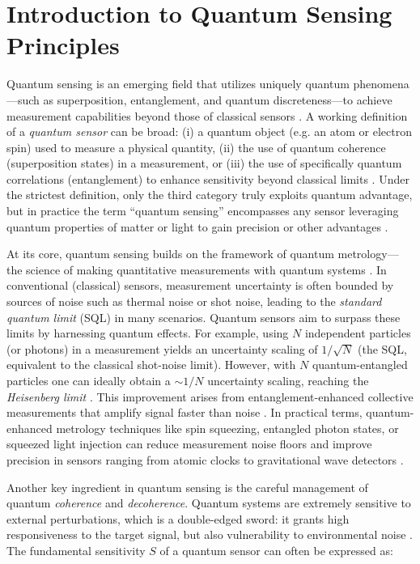 
\chapter{Introduction to Quantum Sensing Principles}

Quantum sensing is an emerging field that utilizes uniquely quantum
phenomena—such as superposition, entanglement, and quantum
discreteness—to achieve measurement capabilities beyond those of
classical sensors . A working definition of a \emph{quantum sensor}
can be broad: (i) a quantum object (e.g. an atom or electron spin)
used to measure a physical quantity, (ii) the use of quantum coherence
(superposition states) in a measurement, or (iii) the use of
specifically quantum correlations (entanglement) to enhance
sensitivity beyond classical limits . Under the strictest definition,
only the third category truly exploits quantum advantage, but in
practice the term “quantum sensing” encompasses any sensor leveraging
quantum properties of matter or light to gain precision or other
advantages .



At its core, quantum sensing builds on the framework of quantum
metrology—the science of making quantitative measurements with quantum
systems . In conventional (classical) sensors, measurement uncertainty
is often bounded by sources of noise such as thermal noise or shot
noise, leading to the \textit{standard quantum limit} (SQL) in many
scenarios. Quantum sensors aim to surpass these limits by harnessing
quantum effects. For example, using $N$ independent particles (or
photons) in a measurement yields an uncertainty scaling of
$1/\sqrt{N}$ (the SQL, equivalent to the classical shot-noise
limit). However, with $N$ quantum-entangled particles one can ideally
obtain a $\sim 1/N$ uncertainty scaling, reaching the \emph{Heisenberg
limit} . This improvement arises from entanglement-enhanced collective
measurements that amplify signal faster than noise . In practical
terms, quantum-enhanced metrology techniques like spin squeezing,
entangled photon states, or squeezed light injection can reduce
measurement noise floors and improve precision in sensors ranging from
atomic clocks to gravitational wave detectors .



Another key ingredient in quantum sensing is the careful management of
quantum \textit{coherence} and \textit{decoherence}. Quantum systems
are extremely sensitive to external perturbations, which is a
double-edged sword: it grants high responsiveness to the target
signal, but also vulnerability to environmental noise . The
fundamental sensitivity $S$ of a quantum sensor can often be expressed
as:

